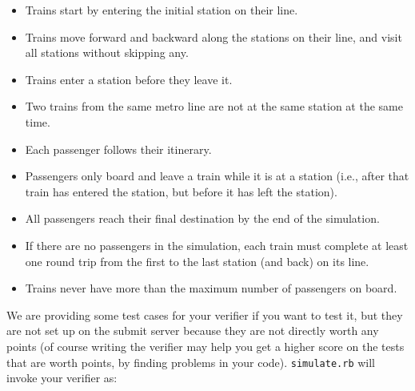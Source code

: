 \documentclass[11pt]{article}
\begin{document}
      \begin{itemize}

        \addtolength{\itemsep}{-1.5mm}

        \item Trains start by entering the initial station on their line.

        \item Trains move forward and backward along the stations on their
              line, and visit all stations without skipping any.

        \item Trains enter a station before they leave it.

        \item Two trains from the same metro line are not at the same
              station at the same time.

        \item Each passenger follows their itinerary.

        \item Passengers only board and leave a train while it is at a
              station (i.e., after that train has entered the station, but
              before it has left the station).

        \item All passengers reach their final destination by the end of the
              simulation.

        \item If there are no passengers in the simulation, each train must
              complete at least one round trip from the first to the last
              station (and back) on its line.

        \item Trains never have more than the maximum number of passengers
              on board.

      \end{itemize}

      \vspace{-1mm}

      We are providing some test cases for your verifier if you want to test
    it, but they are not set up on the submit server because they are not
    directly worth any points (of course writing the verifier may help you
    get a higher score on the tests that are worth points, by finding
    problems in your code).  \texttt{simulate.rb} will invoke your verifier
    as:

      \vspace{-4.5mm}
\end{document}
